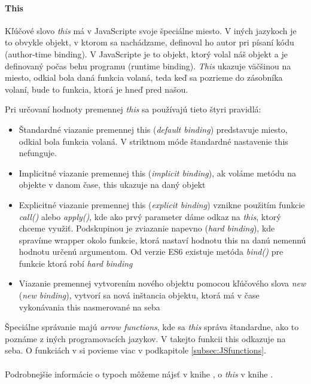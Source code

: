 \paragraph{This}
Kľúčové slovo \emph{this} má v JavaScripte svoje špeciálne miesto. V iných jazykoch je to obvykle objekt, v ktorom sa nachádzame, definoval ho autor pri písaní kódu (author-time binding). V JavaScripte je to objekt, ktorý volal náš objekt a je definovaný počas behu programu (runtime binding). \emph{This} ukazuje väčšinou na miesto, odkial bola daná funkcia volaná, teda keď sa pozrieme do zásobníka volaní, bude to funkcia, ktorá je hneď pred našou.

Pri určovaní hodnoty premennej \emph{this} sa používajú tieto štyri pravidlá:
\begin{itemize}
  \item Štandardné viazanie premennej this (\emph{default binding}) predstavuje miesto, odkial bola funkcia volaná. V striktnom móde štandardné nastavenie this nefunguje.
  \item Implicitné viazanie premennej this (\emph{implicit binding}), ak voláme metódu na objekte v danom čase, this ukazuje na daný objekt
  \item Explicitné viazanie premennej this (\emph{explicit binding}) vznikne použitím funkcie \emph{call()} alebo \emph{apply()}, kde ako prvý parameter dáme odkaz na \emph{this}, ktorý chceme využiť. Podskupinou je zviazanie napevno (\emph{hard binding}), kde spravíme wrapper okolo funkcie, ktorá nastaví hodnotu this na danú nemennú hodnotu určenú argumentom. Od verzie ES6 existuje metóda \emph{bind()} pre funkcie ktorá robí \emph{hard binding}
  \item Viazanie premennej vytvorením nového objektu pomocou kľúčového slova \emph{new} (\emph{new binding}), vytvorí sa nová inštancia objektu, ktorá má v čase vykonávania this nasmerované na seba
\end{itemize}

Špeciálne správanie majú \emph{arrow functions}, kde sa \emph{this} správa štandardne, ako to poznáme z iných programovacích jazykov. V takejto funkcii this odkazuje na seba.
O funkciách v \JS{} si povieme viac v podkapitole \ref{subsec:JSfunctions}.

\paragraph{}
Podrobnejšie informácie o typoch môžeme nájsť v knihe \cite[Types \& Grammar]{youDontKnowJS4}, o \emph{this} v knihe \cite[this \& Object Prototypes]{youDontKnowJS3}.

